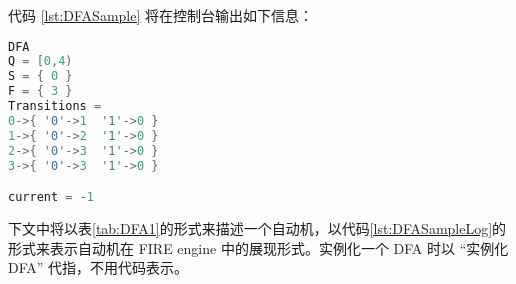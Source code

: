
	

代码 \ref{lst:DFASample} 将在控制台输出如下信息：
\lstset{style=mystyle}
\begin{lstlisting}[language=C++,label={lst:DFASampleLog},caption={图\ref{fig:DFA1}中自动机在 FIRE engine 中的表现形式}]
DFA
Q = [0,4)
S = { 0 }
F = { 3 }
Transitions =
0->{ '0'->1  '1'->0 }
1->{ '0'->2  '1'->0 }
2->{ '0'->3  '1'->0 }
3->{ '0'->3  '1'->0 }

current = -1
\end{lstlisting}

下文中将以表\ref{tab:DFA1}的形式来描述一个自动机，以代码\ref{lst:DFASampleLog}的形式来表示自动机在 FIRE engine 中的展现形式。实例化一个 DFA 时以 “实例化 DFA” 代指，不用代码表示。 